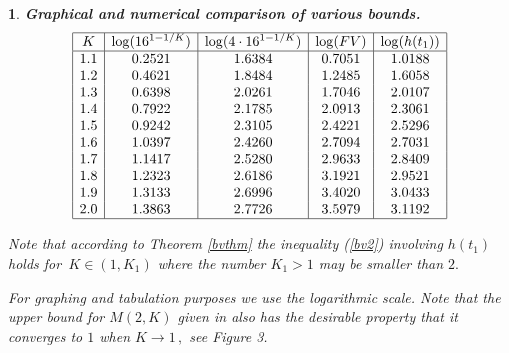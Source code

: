 \documentclass[12pt,a4paper,leqno]{amsart}
\theoremstyle{plain}
\newtheorem{subsec}[equation]{}
\numberwithin{equation}{section}          %
\begin{document}
\begin{subsec}{\bf Graphical and numerical comparison of various bounds.}
\begin{displaymath}
\begin{array}{|c|c|c|c|c|}
\hline
K&\log({16}^{1-1/K})& \log({4\cdot16}^{1-1/K})&\log(FV)&\displaystyle\log(h(t_1))\\
\hline

 1.1 & 0.2521 & 1.6384 & 0.7051 & 1.0188 \\

 1.2 & 0.4621 & 1.8484 & 1.2485 & 1.6058 \\

 1.3 & 0.6398 & 2.0261 & 1.7046 & 2.0107 \\

 1.4 & 0.7922 & 2.1785 & 2.0913 & 2.3061 \\

 1.5 & 0.9242 & 2.3105 & 2.4221 & 2.5296 \\

 1.6 & 1.0397 & 2.4260 & 2.7094 & 2.7031 \\

 1.7 & 1.1417 & 2.5280 & 2.9633 & 2.8409 \\

 1.8 & 1.2323 & 2.6186 & 3.1921 & 2.9521 \\

 1.9 & 1.3133 & 2.6996 & 3.4020 & 3.0433 \\

 2.0 & 1.3863 & 2.7726 & 3.5979 & 3.1192\\
\hline
\end{array}
\end{displaymath}


{\rm
Note that according to Theorem \ref{bvthm} the inequality (\ref{bv2}) involving
 $h(t_1)$
holds for $\,K\in(1,K_1)$ where the number $K_1>1$ may be smaller than $2.$




For graphing and tabulation purposes we use the logarithmic scale.
Note that the upper bound for $M(2,K)$ given in \cite[Theorem 2.29]{fv}
also has the desirable property that it converges to $1$
when $K\to 1\,,$ see Figure 3.
}




\end{subsec}
\end{document}
